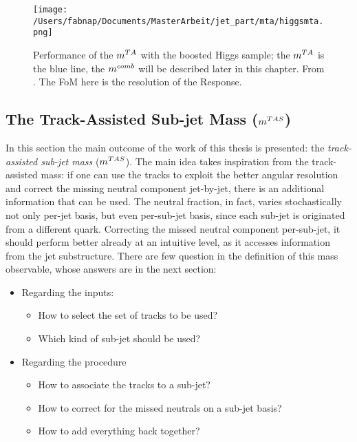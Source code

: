 \begin{figure}[!ht]
  \centering
      \texttt{[image: /Users/fabnap/Documents/MasterArbeit/jet\_part/mta/higgsmta.png]}
  \caption[Performance of the $\mta$ with the boosted Higgs sample]{Performance of the $\mta$ with the boosted Higgs sample; the $\mta$ is the blue line, the $m^{comb}$ will be described later in this chapter. From \cite{art39}. The FoM here is the resolution of the Response.}
  \label{fig:mta4}
\end{figure}



\subsection{The Track-Assisted Sub-jet Mass ($m^{TAS}$)}
In this section the main outcome of the work of this thesis is presented: the \textit{track-assisted sub-jet mass} ($m^{TAS}$).
The main idea takes inspiration from the track-assisted mass: if one can use the tracks to exploit the better angular resolution and correct the missing neutral component jet-by-jet, there is an additional information that can be used. The neutral fraction, in fact, varies stochastically not only per-jet basis, but even per-sub-jet basis, since each sub-jet is originated from a different quark.
Correcting the missed neutral component per-sub-jet, it should perform better already at an intuitive level, as it accesses information from the jet substructure.
There are few question in the definition of this mass observable, whose answers are in the next section:
\begin{itemize}
  \item Regarding the inputs:
  \begin{itemize}
     \item How to select the set of tracks to be used?
     \item Which kind of sub-jet should be used?
  \end{itemize}
  \item Regarding the procedure
  \begin{itemize}
  
  \item How to associate the tracks to a sub-jet?
  \item How to correct for the missed neutrals on a sub-jet basis?
  \item How to add everything back together?
 \end{itemize} 
 
\end{itemize}

